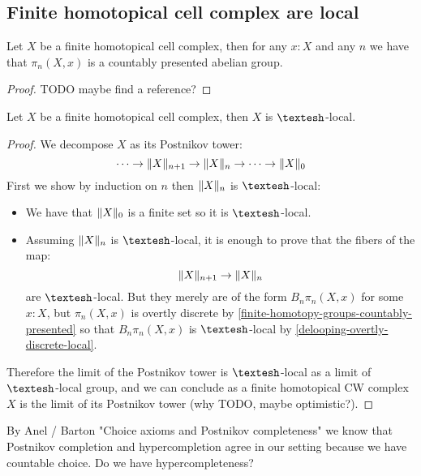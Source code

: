 \subsection{Finite homotopical cell complex are local}

\begin{lemma}\label{finite-homotopy-groups-countably-presented}
Let $X$ be a finite homotopical cell complex, then for any $x:X$ and any $n$ we have that $\pi_n(X,x)$ is a countably presented abelian group.
\end{lemma}

\begin{proof}
TODO maybe find a reference?
\end{proof}

\begin{proposition}\label{homotopical-complex-local}
Let $X$ be a finite homotopical cell complex, then $X$ is $\shape$-local.
\end{proposition}

\begin{proof}
We decompose $X$ as its Postnikov tower:
\[\cdots\to \lVert X \rVert_{n+1}\to \lVert X \rVert_n\to\cdots \to \lVert X \rVert_0\]
First we show by induction on $n$ then $\lVert X \rVert_n$ is $\shape$-local:
\begin{itemize}
\item We have that $\lVert X \rVert_0$ is a finite set so it is $\shape$-local.
\item Assuming $\lVert X \rVert_n$ is $\shape$-local, it is enough to prove that the fibers of the map:
\[\lVert X \rVert_{n+1}\to \lVert X \rVert_n\]
are $\shape$-local. But they merely are of the form $B_n\pi_n(X,x)$ for some $x:X$, but $\pi_n(X,x)$ is overtly discrete by \cref{finite-homotopy-groups-countably-presented} so that $B_n\pi_n(X,x)$ is $\shape$-local by \cref{delooping-overtly-discrete-local}.
\end{itemize}
Therefore the limit of the Postnikov tower is $\shape$-local as a limit of $\shape$-local group, and we can conclude as a finite homotopical CW complex $X$ is the limit of its Postnikov tower (why TODO, maybe optimistic?).
\end{proof}

\begin{remark}
By Anel / Barton "Choice axioms and Postnikov completeness" we know that Postnikov completion and hypercompletion agree in our setting because we have countable choice. Do we have hypercompleteness?
\end{remark}



